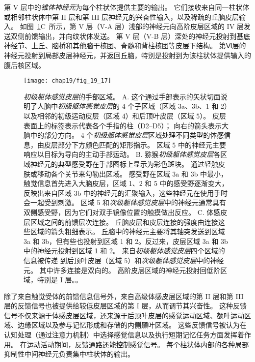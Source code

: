 第 V 层中的\textit{锥体神经元}为每个柱状体提供主要的输出。
它们接收来自同一柱状体或相邻柱状体中第 II 层和第 III 层神经元的兴奋性输入，以及稀疏的丘脑皮层输入。
如图~\ref{fig:19_17}C~所示，第 V 层（V-A 层）浅部的神经元向高阶皮层区域的 IV 层发送双侧前馈输出，并向纹状体发送。
第 V 层（V-B 层）深处的神经元投射到基底神经节、上丘、脑桥和其他脑干核团、脊髓和背柱核团等皮层下结构。
第Ⅵ层的神经元投射到局部皮层神经元，并返回丘脑，特别是投射到为该柱状体提供输入的腹后核区域。


\begin{figure}[htbp]
	\centering
	\texttt{[image: chap19/fig\_19\_17]}
	\caption{\textit{初级躯体感觉皮层}的手部区域。 
		A. 这个通过手部表示的矢状切面说明了人脑中\textit{初级躯体感觉皮层}的 4 个子区域（区域 3a、3b、1 和 2）以及相邻的初级运动皮层（区域 4）和后顶叶皮层（区域 5）。
		皮层表面上的标签表示代表各个手指的柱（D2–D5）；
		向右的箭头表示大脑中的部分方向。
		4 个\textit{初级躯体感觉皮层}区域处理不同类型的体感信息，由皮层部分下方颜色匹配的矩形指示。
		区域 5 中的神经元主要响应以目标为导向的主动手部运动。
		B. 猕猴\textit{初级躯体感觉皮层}各区域神经元的典型感受野在手部图标上显示为彩色斑块。
		通过轻触皮肤或移动各个关节来勾勒出区域。
		感受野在区域 3a 和 3b 中最小，触觉信息首先进入大脑皮层，区域 1、2 和 5 中的感受野逐渐变大，反映出来自区域 3b 中的神经元的汇聚输入，这些神经元在使用手时会一起受到刺激。
		区域 5 和\textit{次级躯体感觉皮层}中的神经元通常具有双侧感受野，因为它们对双手镜像位置的触摸做出反应\cite{gardner1988somatosensory,iwamura1993rostrocaudal,iwamura1994bilateral}。
		C. 体感皮层区域之间的前馈层次连接。
		丘脑皮层和皮层连接的强度由连接这些区域的箭头粗细表示。
		丘脑中的神经元主要将其轴突发送到区域 3a 和 3b，但有些也投射到区域 1 和 2。反过来，皮层区域 3a 和 3b 中的神经元投射到区域 1 和 2。
		来自\textit{初级躯体感觉皮层}四个区域的信息被传递 到后顶叶皮层（区域 5）和\textit{次级躯体感觉皮层}中的神经元。
		其中许多连接是双向的。
		高阶皮层区域的神经元投射回低阶区域，特别是 I 层。\cite{felleman1991distributed}。}
	\label{fig:19_17}
\end{figure}


除了来自触觉受体的前馈信息信号外，来自高级体感皮层区域的第 II 层和第 III 层的反馈信号也被提供给较低皮层区域的第 I 层，从而调节其兴奋性。
这种反馈信号不仅来源于体感皮层区域，还来源于后顶叶皮层的感觉运动区域、额叶运动区域、边缘区域以及参与记忆形成和存储的内侧颞叶区域。
这些反馈信号被认为在认知处理（通过注意力机制）中选择感觉信息以及执行短期记忆任务方面发挥着作用。
在运动活动期间，反馈通路还能控制感觉信号。
每个柱状体内部的各种局部抑制性中间神经元负责集中柱状体的输出。



